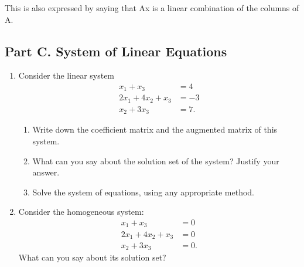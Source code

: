 \documentclass[12pt,a4paper]{article}
\begin{document}
	
	This is also expressed by saying that Ax is a linear combination of the columns of A.
	\subsection*{Part C. System of Linear Equations}
		
	\begin{enumerate}
		\item Consider the linear system
		\begin{align*}
		x_1 + x_3 &= 4\\
		2x_1 + 4x_2 + x_3 &= -3\\
		x_2 + 3x_3 &= 7.
		\end{align*}
		\begin{enumerate}
			\item Write down the coefficient matrix and the augmented matrix of this system. %
			
			\item What can you say about the solution set of the system? Justify your answer. %
			
			\item Solve the system of equations, using any appropriate method. %
		\end{enumerate}
		\item Consider the homogeneous system:
		\begin{align*}
		x_1 + x_3 &= 0\\
		2x_1 + 4x_2 + x_3 &= 0\\
		x_2 + 3x_3 &= 0.
		\end{align*}
		What can you say about its solution set?%
	\end{enumerate}
\end{document}
